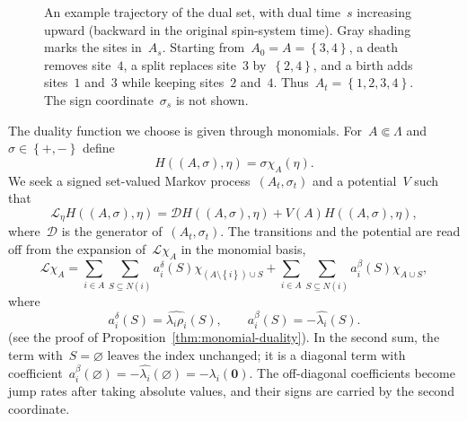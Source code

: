 \documentclass[EJP,preprint,NODS,nobera]{ejpecp}
\newcommand{\bb}[1]{\left(#1\right)}
\newcommand{\cb}[1]{\left\{#1\right\}}
\newcommand{\mb}[1]{\mathbf{#1}}
\newcommand{\Lcal}{\mathcal{L}}
\newcommand{\Dcal}{\mathcal{D}}
\begin{document}
\begin{figure}[htbp]
\endgroup
\caption{An example trajectory of the dual set, with dual time~$s$ increasing
upward (backward in the original spin-system time). Gray shading marks the
sites in~$A_s$. Starting from~$A_0=A=\cb{3,4}$, a death removes site~$4$,
a split replaces site~$3$ by~$\cb{2,4}$, and a birth adds sites~$1$ and~$3$
while keeping sites~$2$ and~$4$. Thus~$A_t=\cb{1,2,3,4}$.
The sign coordinate~$\sigma_s$ is not shown.}
\label{fig:dual-idea}
\end{figure}

The duality function we choose is given through monomials. For~$A\Subset\Lambda$ and~$\sigma\in\cb{+,-}$  define
\begin{equation}
\label{eq:monomial-duality-function}
H((A,\sigma),\eta)
=
\sigma\chi_A(\eta).
\end{equation}
We seek a signed set-valued Markov process~$(A_t,\sigma_t)$ and a potential~$V$
such that
\begin{equation}
\label{eq:monomial-generator-duality}
\Lcal_\eta H((A,\sigma),\eta)
=
\Dcal H((A,\sigma),\eta)
+
V(A)H((A,\sigma),\eta),
\end{equation}
where~$\Dcal$ is the generator of~$(A_t,\sigma_t)$. The transitions and the
potential are read off from the expansion of~$\Lcal\chi_A$ in the monomial
basis,
\begin{equation}
\label{eq:signed-dual-generator-expansion}
\Lcal\chi_A
=
\sum_{i\in A}\sum_{S\subseteq N(i)}
a_i^\delta(S)\chi_{\bb{A\setminus\cb{i}}\cup S}
+
\sum_{i\in A}\sum_{S\subseteq N(i)}
a_i^\beta(S)\chi_{A\cup S},
\end{equation}
where
\begin{equation}
\label{eq:signed-dual-coefficients}
a_i^\delta(S)
=
\widehat{\lambda_i\rho_i}(S),
\qquad
a_i^\beta(S)
=
-\widehat{\lambda_i}(S).
\end{equation}
(see the proof of Proposition~\ref{thm:monomial-duality}). In the second
sum, the term with~$S=\varnothing$ leaves the index unchanged; it is a diagonal
term with coefficient~$a_i^\beta(\varnothing)=-\widehat{\lambda_i}(\varnothing)
=-\lambda_i(\mb 0)$. The off-diagonal coefficients become jump rates after
taking absolute values, and their signs are carried by the second coordinate.
\end{document}
